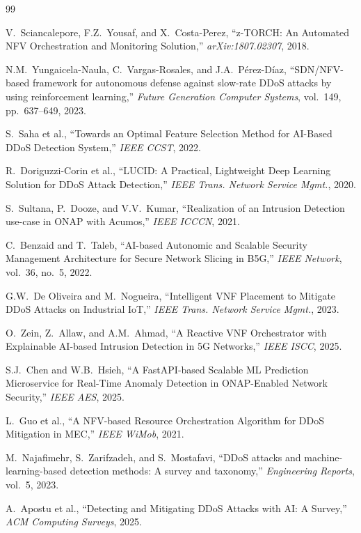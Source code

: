 \documentclass[12pt, a4paper]{article}
\begin{document}
\begin{thebibliography}{99}

V.~Sciancalepore, F.Z.~Yousaf, and X.~Costa-Perez,
``z-TORCH: An Automated NFV Orchestration and Monitoring Solution,''
\textit{arXiv:1807.02307}, 2018.

N.M.~Yungaicela-Naula, C.~Vargas-Rosales, and J.A.~Pérez-Díaz,
``SDN/NFV-based framework for autonomous defense against slow-rate DDoS
attacks by using reinforcement learning,''
\textit{Future Generation Computer Systems}, vol.~149, pp.~637--649, 2023.

S.~Saha et al.,
``Towards an Optimal Feature Selection Method for AI-Based DDoS Detection
System,'' \textit{IEEE CCST}, 2022.

R.~Doriguzzi-Corin et al.,
``LUCID: A Practical, Lightweight Deep Learning Solution for DDoS Attack
Detection,'' \textit{IEEE Trans. Network Service Mgmt.}, 2020.

S.~Sultana, P.~Dooze, and V.V.~Kumar,
``Realization of an Intrusion Detection use-case in ONAP with Acumos,''
\textit{IEEE ICCCN}, 2021.

C.~Benzaid and T.~Taleb,
``AI-based Autonomic and Scalable Security Management Architecture for
Secure Network Slicing in B5G,''
\textit{IEEE Network}, vol.~36, no.~5, 2022.

G.W.~De Oliveira and M.~Nogueira,
``Intelligent VNF Placement to Mitigate DDoS Attacks on Industrial IoT,''
\textit{IEEE Trans. Network Service Mgmt.}, 2023.

O.~Zein, Z.~Allaw, and A.M.~Ahmad,
``A Reactive VNF Orchestrator with Explainable AI-based Intrusion Detection
in 5G Networks,''
\textit{IEEE ISCC}, 2025.

S.J.~Chen and W.B.~Hsieh,
``A FastAPI-based Scalable ML Prediction Microservice for Real-Time
Anomaly Detection in ONAP-Enabled Network Security,''
\textit{IEEE AES}, 2025.

L.~Guo et al.,
``A NFV-based Resource Orchestration Algorithm for DDoS Mitigation in MEC,''
\textit{IEEE WiMob}, 2021.

M.~Najafimehr, S.~Zarifzadeh, and S.~Mostafavi,
``DDoS attacks and machine-learning-based detection methods: A survey and
taxonomy,''
\textit{Engineering Reports}, vol.~5, 2023.

A.~Apostu et al.,
``Detecting and Mitigating DDoS Attacks with AI: A Survey,''
\textit{ACM Computing Surveys}, 2025.

\end{thebibliography}
\end{document}
